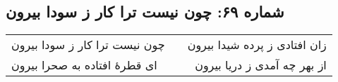 \begin{center}
\section*{شماره ۶۹: چون نیست ترا کار ز سودا بیرون}
\label{sec:069}
\begin{longtable}{l p{0.5cm} r}
چون نیست ترا کار ز سودا بیرون
&&
زان افتادی ز پرده شیدا بیرون
\\
ای قطرهٔ افتاده به صحرا بیرون
&&
از بهر چه آمدی ز دریا بیرون
\\
\end{longtable}
\end{center}
